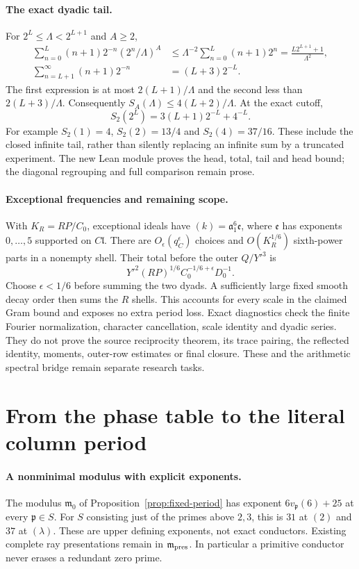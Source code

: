 \paragraph{The exact dyadic tail.}
For $2^L\le\Lambda<2^{L+1}$ and $A\ge2$,
\begin{align*}
 \sum_{n=0}^L(n+1)2^{-n}(2^n/\Lambda)^A
 &\le\Lambda^{-2}\sum_{n=0}^L(n+1)2^n
   =\frac{L2^{L+1}+1}{\Lambda^2},\\
 \sum_{n=L+1}^\infty(n+1)2^{-n}&=(L+3)2^{-L}.
\end{align*}
The first expression is at most $2(L+1)/\Lambda$ and the second
less than $2(L+3)/\Lambda$. Consequently
$S_A(\Lambda)\le4(L+2)/\Lambda$.
At the exact cutoff,
\[
 S_2(2^L)=3(L+1)2^{-L}+4^{-L}.
\]
For example $S_2(1)=4$, $S_2(2)=13/4$ and
$S_2(4)=37/16$. These include the closed infinite tail, rather than
silently replacing an infinite sum by a truncated experiment.
The new Lean module proves the head, total, tail and head bound;
the diagonal regrouping and full comparison remain prose.

\paragraph{Exceptional frequencies and remaining scope.}
With $K_R=RP/C_0$, exceptional ideals have
$(k)=\mathfrak a_1^6\mathfrak e$, where $\mathfrak e$ has exponents
$0,\ldots,5$ supported on $C\mathfrak l$.
There are $O_\epsilon(q_C^\epsilon)$ choices and
$O(K_R^{1/6})$ sixth-power parts in a nonempty shell.
Their total before the outer $Q/Y'^3$ is
\[
 Y'^2(RP)^{1/6}C_0^{-1/6+\epsilon}D_0^{-1}.
\]
Choose $\epsilon<1/6$ before summing the two dyads. A sufficiently
large fixed smooth decay order then sums the $R$ shells.
This accounts for every scale in the claimed Gram bound and exposes
no extra period loss. Exact diagnostics check the finite Fourier
normalization, character cancellation, scale identity and dyadic series.
They do not prove the source reciprocity theorem, its trace pairing,
the reflected identity, moments, outer-row estimates or final closure.
These and the arithmetic spectral bridge remain separate research tasks.

\section{From the phase table to the literal column period}
\paragraph{A nonminimal modulus with explicit exponents.}
The modulus $\mathfrak m_0$ of Proposition~\ref{prop:fixed-period}
has exponent $6v_{\mathfrak p}(6)+25$ at every $\mathfrak p\in S$.
For $S$ consisting just of the primes above $2,3$, this is $31$ at
$(2)$ and $37$ at $(\lambda)$.
These are upper defining exponents, not exact conductors.
Existing complete ray presentations remain in $\mathfrak m_{\rm pres}$.
In particular a primitive conductor never erases a redundant zero prime.

